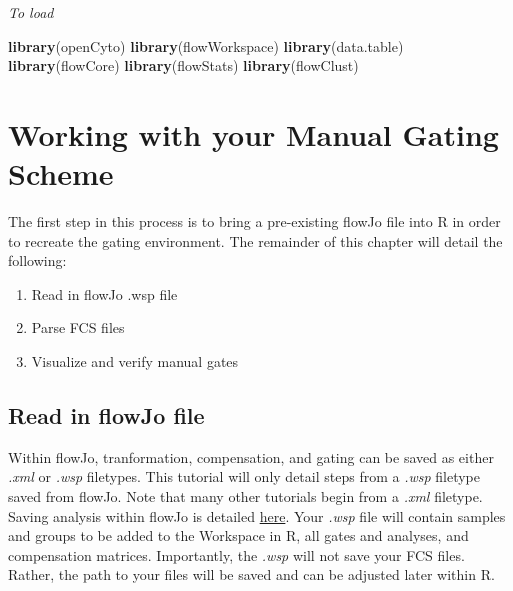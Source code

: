 \documentclass[]{book}
\newenvironment{Shaded}{\begin{snugshade}}{\end{snugshade}}
\newcommand{\KeywordTok}[1]{\textcolor[rgb]{0.13,0.29,0.53}{\textbf{#1}}}
\newcommand{\NormalTok}[1]{#1}
\providecommand{\tightlist}{%
  \setlength{\itemsep}{0pt}\setlength{\parskip}{0pt}}
\begin{document}
\emph{To load}

\begin{Shaded}
\begin{Highlighting}[]
\KeywordTok{library}\NormalTok{(openCyto)}
\KeywordTok{library}\NormalTok{(flowWorkspace)}
\KeywordTok{library}\NormalTok{(data.table)}
\KeywordTok{library}\NormalTok{(flowCore)}
\KeywordTok{library}\NormalTok{(flowStats)}
\KeywordTok{library}\NormalTok{(flowClust)}
\end{Highlighting}
\end{Shaded}

\hypertarget{working-with-your-manual-gating-scheme}{%
\chapter{Working with your Manual Gating Scheme}\label{working-with-your-manual-gating-scheme}}

The first step in this process is to bring a pre-existing flowJo file into R in order to recreate the gating environment. The remainder of this chapter will detail the following:

\begin{enumerate}
\def\labelenumi{\arabic{enumi}.}
\tightlist
\item
  Read in flowJo .wsp file\\
\item
  Parse FCS files\\
\item
  Visualize and verify manual gates
\end{enumerate}

\hypertarget{read-in-flowjo-file}{%
\section{Read in flowJo file}\label{read-in-flowjo-file}}

Within flowJo, tranformation, compensation, and gating can be saved as either \emph{.xml} or \emph{.wsp} filetypes. This tutorial will only detail steps from a \emph{.wsp} filetype saved from flowJo. Note that many other tutorials begin from a \emph{.xml} filetype. Saving analysis within flowJo is detailed \href{http://docs.flowjo.com/vx/workspaces-and-samples/ws-savinganalysis/}{here}. Your \emph{.wsp} file will contain samples and groups to be added to the Workspace in R, all gates and analyses, and compensation matrices. Importantly, the \emph{.wsp} will not save your FCS files. Rather, the path to your files will be saved and can be adjusted later within R.
\end{document}
